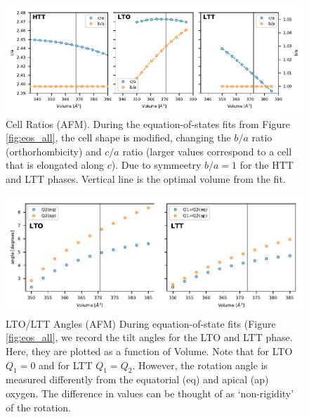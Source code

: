 \begin{figure}
    \centering
    \includegraphics[width=\textwidth]{fig/simulation/ratio_all.pdf}
    \caption[AFM: Cell ratios during EOS fits]{Cell Ratios (AFM). During the equation-of-states fits from Figure \ref{fig:eos_all}, the cell shape is modified, changing the $b/a$ ratio (orthorhombicity) and $c/a$ ratio (larger values correspond to a cell that is elongated along $c$). Due to symmeetry $b/a = 1$ for the HTT and LTT phases. Vertical line is the optimal volume from the fit.}
    \label{fig:eos_ratios}
\end{figure}

\begin{figure}
    \centering
    \includegraphics[width=\textwidth]{fig/simulation/angles_lto_ltt.pdf}
    \caption[AFM: LTO/LTT angles during EOS fits]{LTO/LTT Angles (AFM) During equation-of-state fits (Figure \ref{fig:eos_all}, we record the tilt angles for the LTO and LTT phase. Here, they are plotted as a function of Volume. Note that for LTO $Q_1=0$ and for LTT $Q_1=Q_2$. However, the rotation angle is measured differently from the equatorial (eq) and apical (ap) oxygen. The difference in values can be thought of as `non-rigidity' of the rotation.}
    \label{fig:my_label}
\end{figure}


